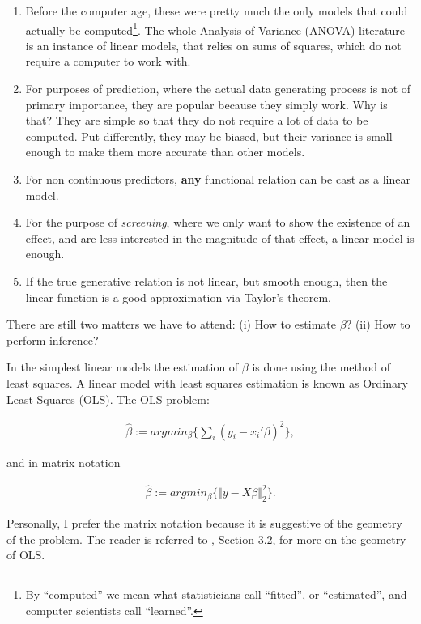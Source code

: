 \documentclass[]{book}
\theoremstyle{definition}
\theoremstyle{definition}
\theoremstyle{definition}
\theoremstyle{remark}
\let\BeginKnitrBlock\begin \let\EndKnitrBlock\end
\begin{document}
\begin{enumerate}
\def\labelenumi{\arabic{enumi}.}
\item
  Before the computer age, these were pretty much the only models that
  could actually be computed\footnote{By ``computed'' we mean what
    statisticians call ``fitted'', or ``estimated'', and computer
    scientists call ``learned''.}. The whole Analysis of Variance
  (ANOVA) literature is an instance of linear models, that relies on
  sums of squares, which do not require a computer to work with.
\item
  For purposes of prediction, where the actual data generating process
  is not of primary importance, they are popular because they simply
  work. Why is that? They are simple so that they do not require a lot
  of data to be computed. Put differently, they may be biased, but their
  variance is small enough to make them more accurate than other models.
\item
  For non continuous predictors, \textbf{any} functional relation can be
  cast as a linear model.
\item
  For the purpose of \emph{screening}, where we only want to show the
  existence of an effect, and are less interested in the magnitude of
  that effect, a linear model is enough.
\item
  If the true generative relation is not linear, but smooth enough, then
  the linear function is a good approximation via Taylor's theorem.
\end{enumerate}

There are still two matters we have to attend: (i) How to estimate
\(\beta\)? (ii) How to perform inference?

In the simplest linear models the estimation of \(\beta\) is done using
the method of least squares. A linear model with least squares
estimation is known as Ordinary Least Squares (OLS). The OLS problem:

\begin{align}
  \hat \beta:= argmin_\beta \{ \sum_i (y_i-x_i'\beta)^2 \},
  \label{eq:ols}
\end{align}

and in matrix notation

\begin{align}
  \hat \beta:= argmin_\beta \{ \Vert y-X\beta \Vert^2_2 \}.
  \label{eq:ols-matrix}
\end{align}

\BeginKnitrBlock{remark}
{}Personally, I prefer the matrix notation
because it is suggestive of the geometry of the problem. The reader is
referred to \citet{friedman2001elements}, Section 3.2, for more on the
geometry of OLS.
\EndKnitrBlock{remark}
\end{document}

